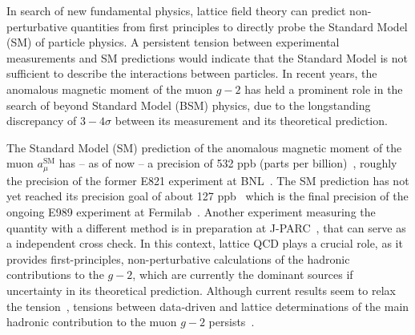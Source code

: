 In search of new fundamental physics, lattice field theory
can predict non-perturbative quantities from first principles
to directly probe the Standard Model (SM) of particle physics.
A persistent tension between experimental measurements and SM predictions would indicate that the Standard Model is not sufficient to describe the interactions between particles.
In recent years, the anomalous magnetic moment of the muon $g-2$ has held a prominent role in the search of beyond Standard Model (BSM) physics, due to the longstanding discrepancy of $3-4\sigma$ \cite{snowmass:2020} between its measurement and its theoretical prediction.

The Standard Model (SM) prediction of the anomalous magnetic moment of the muon $a_{\mu}^{\text{SM}}$ has -- as of now -- a precision of \num{532} ppb (parts per billion)~\cite{snowmass:2025}, roughly the precision of the former E821 experiment at BNL~\cite{PhysRevD.73.072003}.
The SM prediction has not yet reached its precision goal of about \num{127} ppb~\cite{online:gm2} which is the final precision of the ongoing E989 experiment at Fermilab~\cite{Muong-2:2025xyk}.
Another experiment measuring the quantity with a different method is in preparation at J-PARC~\cite{10.1093/ptep/ptz030}, that can serve as a independent cross check.
In this context, lattice QCD plays a crucial role, as it provides first-principles, non-perturbative calculations of the hadronic contributions to the $g-2$, which are currently the dominant sources if uncertainty in its theoretical prediction.
Although current results seem to relax the tension~\cite{Muong-2:2025xyk,snowmass:2025}, tensions between data-driven and lattice determinations of the main hadronic contribution to the muon $g-2$ persists~\cite{snowmass:2025}.


